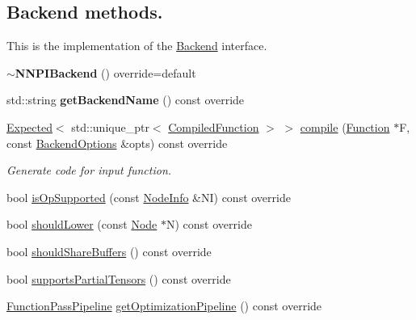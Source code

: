 \subsection*{Backend methods.}
\label{_amgrp74a5605ee0c2530d0af87631bd615b01}%
 This is the implementation of the \hyperlink{classglow_1_1_backend}{Backend} interface. \begin{DoxyCompactItemize}
\item 
\mbox{\label{classglow_1_1_n_n_p_i_backend_a6ebd9a995eed0b13737af7ef8b140583}} 
{\bfseries $\sim$\+N\+N\+P\+I\+Backend} () override=default
\item 
\mbox{\label{classglow_1_1_n_n_p_i_backend_a16935c6aea516981bc9fcefa47d06293}} 
std\+::string {\bfseries get\+Backend\+Name} () const override
\item 
\hyperlink{classglow_1_1detail_1_1_glow_expected}{Expected}$<$ std\+::unique\+\_\+ptr$<$ \hyperlink{classglow_1_1_compiled_function}{Compiled\+Function} $>$ $>$ \hyperlink{classglow_1_1_n_n_p_i_backend_af773c63c90b4d6c89c75c0057e5a6157}{compile} (\hyperlink{classglow_1_1_function}{Function} $\ast$F, const \hyperlink{structglow_1_1_backend_options}{Backend\+Options} \&opts) const override
\begin{DoxyCompactList}\small\item\em Generate code for input function. \end{DoxyCompactList}\item 
bool \hyperlink{classglow_1_1_n_n_p_i_backend_a901bcc9a7a53184a2dd74ab26d6dc32c}{is\+Op\+Supported} (const \hyperlink{classglow_1_1_node_info}{Node\+Info} \&NI) const override
\item 
bool \hyperlink{classglow_1_1_n_n_p_i_backend_a3e44cab4bf6fa70d239abb2c70a1a465}{should\+Lower} (const \hyperlink{classglow_1_1_node}{Node} $\ast$N) const override
\item 
bool \hyperlink{classglow_1_1_n_n_p_i_backend_ae831e2d887416d5ee461f1b898230b66}{should\+Share\+Buffers} () const override
\item 
bool \hyperlink{classglow_1_1_n_n_p_i_backend_a83a437d7624740427aa1aa650e381576}{supports\+Partial\+Tensors} () const override
\item 
\mbox{\label{classglow_1_1_n_n_p_i_backend_af71da0f6261890ee8c370eff659b4e3d}} 
\hyperlink{classglow_1_1_function_pass_pipeline}{Function\+Pass\+Pipeline} \hyperlink{classglow_1_1_n_n_p_i_backend_af71da0f6261890ee8c370eff659b4e3d}{get\+Optimization\+Pipeline} () const override

\end{DoxyCompactItemize}
